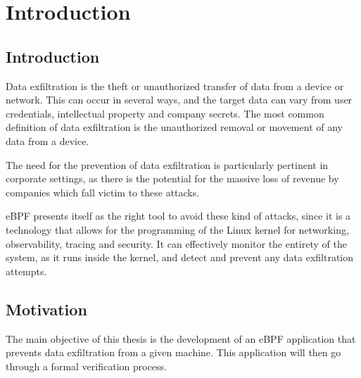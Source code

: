 \chapter{Introduction}
\label{chap:int}


\section{Introduction}

Data exfiltration is the theft or unauthorized transfer of data from a device or network. This can occur in several ways, and the target data can vary from user credentials, intellectual property and company secrets.
The most common definition of data exfiltration is the unauthorized removal or movement of any data from a device.

The need for the prevention of data exfiltration is particularly pertinent in corporate settings, as there is the potential for the massive loss of revenue by companies which fall victim to these attacks. 

eBPF presents itself as the right tool to avoid these kind of attacks, since it is a technology that allows for the programming of the Linux kernel for networking, observability, tracing and security. It can effectively monitor the entirety of the system, as it runs inside the kernel, and detect and prevent any data exfiltration attempts.

\section{Motivation}

The main objective of this thesis is the development of an eBPF application that prevents data exfiltration from a given machine. This application will then go through a formal verification process. 

